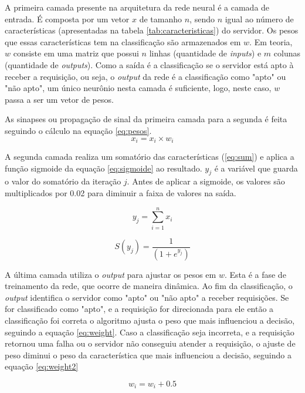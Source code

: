 A primeira camada presente na arquitetura da rede neural é a camada de entrada. É composta por um vetor $x$ de tamanho $n$, sendo $n$ igual ao número de características (apresentadas na tabela \ref{tab:caracteristicas}) do servidor. Os pesos que essas características tem na classificação são armazenados em $w$. Em teoria, $w$ consiste em uma matriz que possui $n$ linhas (quantidade de \textit{inputs}) e $m$ colunas (quantidade de \textit{outputs}). Como a saída é a classificação se o servidor está apto à receber a requisição, ou seja, o \textit{output} da rede é a classificação como "apto" ou "não apto", um único neurônio nesta camada é suficiente, logo, neste caso, $w$ passa a ser um vetor de pesos. 

As sinapses ou propagação de sinal da primeira camada para a segunda é feita seguindo o cálculo na equação \ref{eq:pesos}. 
\begin{equation}
x_i = x_i \times w_i
\label{eq:pesos}
\end{equation}

A segunda camada realiza um somatório das características (\ref{eq:sum}) e aplica a função sigmoide da equação \ref{eq:sigmoide} ao resultado. $y_j$ é a variável que guarda o valor do somatório da iteração $j$. Antes de aplicar a sigmoide, os valores são multiplicados por 0.02 para diminuir a faixa de valores na saída. 

\begin{equation}
y_j = \sum_{i=1}^{n} {x_i}
\label{eq:sum}
\end{equation}


\begin{equation}
S(y_j) =  \frac{1}{(1 + e ^ {y_j} )} 
\label{eq:sigmoide}
\end{equation}

A última camada utiliza o \textit{output} para ajustar os pesos em $w$. Esta é a fase de treinamento da rede, que ocorre de maneira dinâmica. Ao fim da classificação, o \textit{output} identifica o servidor como "apto" ou "não apto" a receber requisições. Se for classificado como "apto", e a requisição for direcionada para ele então a classificação foi correta o algoritmo ajusta o peso que mais influenciou a decisão, seguindo a equação \ref{eq:weight}. Caso a classificação seja incorreta, e a requisição retornou uma falha ou o servidor não conseguiu atender a requisição, o ajuste de peso diminui o peso da característica que mais influenciou a decisão, seguindo a equação \ref{eq:weight2}

\begin{equation}
w_i = w_i + 0.5
\label{eq:weight}
\end{equation}

